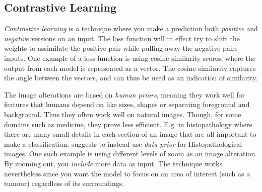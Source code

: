 \documentclass[10pt,twocolumn,letterpaper]{article}
\begin{document}

\subsection{Contrastive Learning}
\label{sec:contrastiveLearning}
\textit{Contrastive learning} is a technique where you make a prediction both \textit{positive} and \textit{negative} versions on an input. The loss function will in effect try to shift the weights to assimilate the positive pair while pulling away the negative pairs inputs. One example of a loss function is using cosine similarity scores, where the output from each model is represented as a vector. The cosine similarity captures the angle between the vectors, and can thus be used as an indication of similarity. 

The image alterations are based on \textit{human priors}, meaning they work well for features that humans depend on like sizes, shapes or separating foreground and background. Thus they often work well on natural images. Though, for some domains such as medicine, they prove less efficient. E.g. in histopathology where there are many small details in each section of an image that are all important to make a classification. \cite{dataPriors} suggests to instead use \textit{data prior} for Histopathological images. One such example is using different levels of zoom as an image alteration. By zooming out, you \textit{include} more data as input. The technique works nevertheless since you want the model to focus on an area of interest (such as a tumour) regardless of its surroundings.
\end{document}
